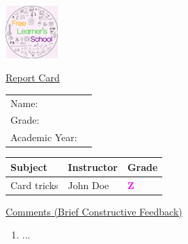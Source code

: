 \documentclass[17pt]{extarticle}
\begin{document}
\begin{center}
\begin{minipage}{.4\textwidth}
\includegraphics[height=2cm]{fls-school-logo.png}
\end{minipage}
\end{center}
\centering
{\Large \underline{Report Card}}
\begin{tabularx}{\textwidth}{lX}
Name: &  \\
Grade: &  \\
Academic Year: &  \\
\end{tabularx}
\vspace{10mm}
\begin{tabularx}{\textwidth}{|X|l|l|}
\hline
  \textbf{Subject} & \textbf{Instructor} & \textbf{Grade} \\
\hline
Card tricks &
John Doe &
\textcolor{magenta}{\textbf{Z}}
\\
\hline
\end{tabularx}
\underline{Comments (Brief Constructive Feedback)}
\begin{enumerate}
\item ...
\end{enumerate}
\end{document}
